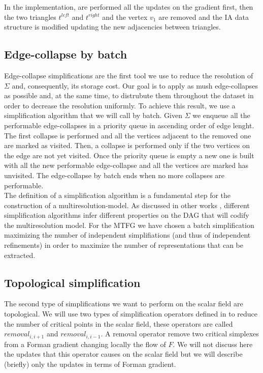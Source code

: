 \documentclass[preprint,5p,times,onecolumn]{article}
\begin{document}
In the implementation, are performed all the updates on the gradient first, then the two triangles $t^{left}$ and $t^{right}$ and the vertex $v_1$ are removed and the IA data structure is modified updating the new adjacencies between triangles.


\subsection{Edge-collapse by batch}
Edge-collapse simplifications are the first tool we use to reduce the resolution of $\Sigma$ and, consequently, its storage cost. Our goal is to apply as mush edge-collapses as possible and, at the same time, to distrubute them throughout the dataset in order to decrease the resolution uniformly. To achieve this result, we use a simplification algorithm that we will call by batch. Given $\Sigma$ we enqueue all the performable edge-collapses in a priority queue in ascending order of edge lenght. The first collapse is performed and all the vertices adjacent to the removed one are marked as visited. Then, a collapse is performed only if the two vertices on the edge are not yet visited. Once the priority queue is empty a new one is built with all the new performable edge-collapse and all the vertices are marked has unvisited. The edge-collapse by batch ends when no more collapses are performable.\\

The definition of a simplification algorithm is a fundamental step for the construction of a multiresolution-model. As discussed in other works \cite{Comi13}, different simplification algorithms infer different properties on the DAG that will codify the multiresolution model. For the MTFG we have chosen a batch simplification maximizing the number of independent simplifiations (and thus of independent refinements) in order to maximize the number of representations that can be extracted.



\subsection{Topological simplification}
The second type of simplifications we want to perform on the scalar field are topological. We will use two types of simplification operators defined in \cite{Comi11} to reduce the number of critical points in the scalar field, these operators are called $removal_{i,i+1}$ and $removal_{i,i-1}$. A removal operator remove two critical simplexes from a Forman gradient changing locally the flow of $F$. We will not discuss here the updates that this operator causes on the scalar field but we will describe (briefly) only the updates in terms of Forman gradient.\\
\end{document}
